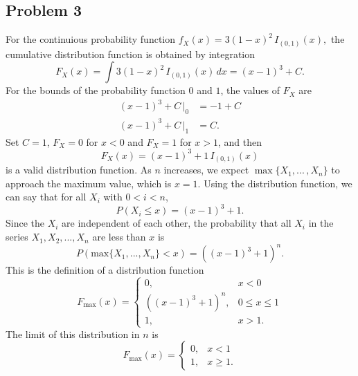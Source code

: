 \documentclass{article}
\begin{document}
\subsection*{Problem 3}
For the continuious probability function $f_X(x) = 3(1-x)^2\,I_{(0,1)}(x),$ the cumulative distribution function is obtained by integration \[F_X(x) = \int 3(1-x)^2\,I_{(0,1)}(x)\,dx = (x-1)^3 + C.\] For the bounds of the probability function $0$ and $1$, the values of $F_X$ are 
\[\begin{aligned}
(x-1)^3 + C\,\big|_0 &= -1 + C \\
(x-1)^3 + C\,\big|_1 &= C.
\end{aligned}\]
Set $C = 1$, $F_X = 0$ for $x < 0$ and $F_X = 1$ for $x > 1$, and then 
\[F_X(x) = (x-1)^3 + 1\,I_{(0,1)}(x)\] is a valid distribution function. As $n$ increases, we expect $\max\{X_1, ...\,, X_n\}$ to approach the maximum value, which is $x = 1$. Using the distribution function, we can say that for all $X_i$ with $0<i<n$,
\[ P(X_i \leq x) = (x-1)^3 + 1.\] Since the $X_i$ are independent of each other, the probability that all $X_i$ in the series $X_1, X_2, ... , X_n$ are less than $x$ is \[P\left(\text{max}\{X_1, ... , X_n\} < x\right) = \left((x-1)^3 + 1\right)^n.\]
This is the definition of a distribution function 
\[F_{\text{max}}(x) = \begin{cases}
0, &x < 0 \\
\left((x-1)^3 + 1\right)^n, &0\leq x \leq1 \\
1, & x > 1.\end{cases}\] The limit of this distribution in $n$ is 
\[F_{\text{max}}(x) = \begin{cases}
0, &x < 1 \\1, & x \geq 1.\end{cases}\]

\iffalse
, we can determine the probability that any one $_i$ is more than $\epsilon$ away from the maximum possible value, $1$. Wwe can say that for all $X_i$ with $0<i<n$,
\[ P(X_i \leq 1 - \epsilon) = \left((1-\epsilon)-1\right)^3+1 = 1 - \epsilon^3\] for $x = 1 - \epsilon; \,\,0 \leq \epsilon \leq 1$. Since the $X_i$ are independent of each other, the probability that all $X_i$ in the series $X_1, X_2, ... , X_n$ are less than $1-\epsilon$ is \[P\left(\text{max}\{X_1, ... , X_n\} < 1 - \epsilon\right) = \left(1-\epsilon^3\right)^n.\]
This is the definition of a distribution function \[F_{\text{max}}(1-\epsilon) = \left(1-\epsilon^3\right)^n\,I_\epsilon(0,1).\] The distribution function for $T_n$ can thus be obtained as 
\[T_n(1-\epsilon) = n^{1/3}\left(1-\left(1-\epsilon^3\right)^n\right)\,I_\epsilon(0,1).\]
\fi
\end{document}
